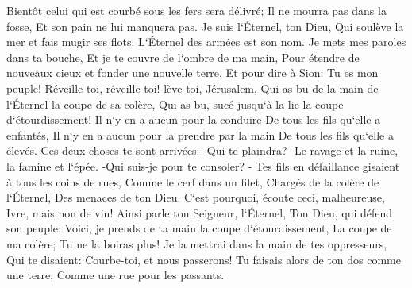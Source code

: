 \verse Bientôt celui qui est courbé sous les fers sera délivré; Il ne mourra pas dans la fosse, Et son pain ne lui manquera pas. 
\verse Je suis l`Éternel, ton Dieu, Qui soulève la mer et fais mugir ses flots. L`Éternel des armées est son nom. 
\verse Je mets mes paroles dans ta bouche, Et je te couvre de l`ombre de ma main, Pour étendre de nouveaux cieux et fonder une nouvelle terre, Et pour dire à Sion: Tu es mon peuple! 
\verse Réveille-toi, réveille-toi! lève-toi, Jérusalem, Qui as bu de la main de l`Éternel la coupe de sa colère, Qui as bu, sucé jusqu`à la lie la coupe d`étourdissement! 
\verse Il n`y en a aucun pour la conduire De tous les fils qu`elle a enfantés, Il n`y en a aucun pour la prendre par la main De tous les fils qu`elle a élevés. 
\verse Ces deux choses te sont arrivées: -Qui te plaindra? -Le ravage et la ruine, la famine et l`épée. -Qui suis-je pour te consoler? - 
\verse Tes fils en défaillance gisaient à tous les coins de rues, Comme le cerf dans un filet, Chargés de la colère de l`Éternel, Des menaces de ton Dieu. 
\verse C`est pourquoi, écoute ceci, malheureuse, Ivre, mais non de vin! 
\verse Ainsi parle ton Seigneur, l`Éternel, Ton Dieu, qui défend son peuple: Voici, je prends de ta main la coupe d`étourdissement, La coupe de ma colère; Tu ne la boiras plus! 
\verse Je la mettrai dans la main de tes oppresseurs, Qui te disaient: Courbe-toi, et nous passerons! Tu faisais alors de ton dos comme une terre, Comme une rue pour les passants. 

